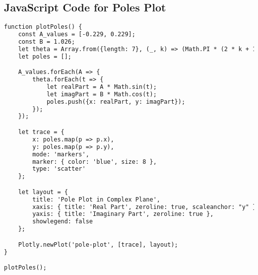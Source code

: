 \documentclass{article}
\begin{document}
\subsection{JavaScript Code for Poles Plot}
\begin{lstlisting}[language=HTML, caption=Filter Type Definition]
function plotPoles() {
    const A_values = [-0.229, 0.229];
    const B = 1.026;
    let theta = Array.from({length: 7}, (_, k) => (Math.PI * (2 * k + 1)) / 14);
    let poles = [];

    A_values.forEach(A => {
        theta.forEach(t => {
            let realPart = A * Math.sin(t);
            let imagPart = B * Math.cos(t);
            poles.push({x: realPart, y: imagPart});
        });
    });

    let trace = {
        x: poles.map(p => p.x),
        y: poles.map(p => p.y),
        mode: 'markers',
        marker: { color: 'blue', size: 8 },
        type: 'scatter'
    };

    let layout = {
        title: 'Pole Plot in Complex Plane',
        xaxis: { title: 'Real Part', zeroline: true, scaleanchor: "y" },
        yaxis: { title: 'Imaginary Part', zeroline: true },
        showlegend: false
    };

    Plotly.newPlot('pole-plot', [trace], layout);
}

plotPoles();
\end{lstlisting}
\end{document}
